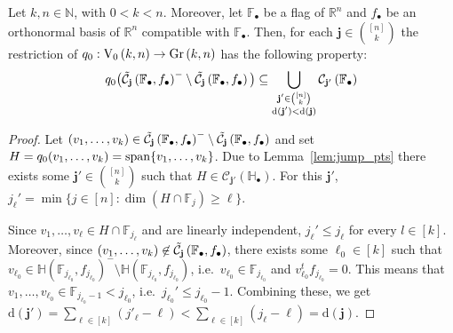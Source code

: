 \begin{lemma}\label{lem:q0_on_bdr} Let $k,n\in\mathbb{N}$, with $0<k<n$. Moreover, let $\mathbb{F}_{\bullet}$ be a flag of $\mathbb{R}^n$ and $f_{\bullet}$ be an orthonormal basis of $\mathbb{R}^n$ compatible with $\mathbb{F}_{\bullet}$. Then, for each $\mathbf{j}\in\binom{[n]}{k}$ the restriction of $q_0:\StO{k}{n}\to\Gr{k}{n}$ has the following property:
\[q_0\big(\tilde{\mathcal{C}}_{\mathbf{j}}\left(\mathbb{F}_{\bullet},f_{\bullet}\right)^-\setminus\tilde{\mathcal{C}}_{\mathbf{j}}\left(\mathbb{F}_{\bullet},f_{\bullet}\right)\big)\subseteq\bigcup_{\substack{\mathbf{j}'\in\binom{[n]}{k}\\\mathrm{d}(\mathbf{j}')<\mathrm{d}(\mathbf{j})}}\mathcal{C}_{\mathbf{j'}}\left(\mathbb{F}_{\bullet}\right)\]
\end{lemma}
\begin{proof} Let $(v_1,\ldots,v_k)\in\tilde{\mathcal{C}}_{\mathbf{j}}\left(\mathbb{F}_{\bullet},f_{\bullet}\right)^-\setminus\tilde{\mathcal{C}}_{\mathbf{j}}\left(\mathbb{F}_{\bullet},f_{\bullet}\right)$ and set $H=q_0(v_1,\ldots,v_k)=\mathrm{span}\{v_1,\ldots,v_k\}$. Due to Lemma~\ref{lem:jump_pts} there exists some $\mathbf{j}'\in\binom{[n]}{k}$ such that $H\in\mathcal{C}_{\mathbf{j}'}(\mathbb{H}_{\bullet})$. For this $\mathbf{j}'$,
$j_{\ell}'=\min\{j\in[n]:\dim(H\cap\mathbb{F}_j)\geq\ell\}$.

Since $v_1,\ldots,v_{\ell}\in H\cap\mathbb{F}_{j_{\ell}}$ and are linearly independent, $j_{\ell}'\leq j_{\ell}$ for every $l\in[k]$. Moreover, since $(v_1,\ldots,v_k)\not\in\tilde{\mathcal{C}}_{\mathbf{j}}\left(\mathbb{F}_{\bullet},f_{\bullet}\right)$, there exists some $\ell_0\in[k]$ such that $v_{\ell_0}\in\mathbb{H}(\mathbb{F}_{j_{\ell_0}},f_{j_{\ell_0}})^-\setminus\mathbb{H}(\mathbb{F}_{j_{\ell_0}},f_{j_{\ell_0}})$, i.e.\ $v_{\ell_0}\in\mathbb{F}_{j_{\ell_0}}$ and $v_{\ell_0}^tf_{j_{\ell_0}}=0$. This means that $v_1,\ldots,v_{\ell_0}\in\mathbb{F}_{j_{\ell_0}-1}<j_{\ell_0}$, i.e.\ $j_{\ell_0}'\leq j_{\ell_0}-1$. Combining these, we get
$\mathrm{d}(\mathbf{j}')=\sum_{\ell\in[k]}(j'_{\ell}-\ell)<\sum_{\ell\in[k]}(j_{\ell}-\ell)=\mathrm{d}(\mathbf{j})$.
\end{proof}

